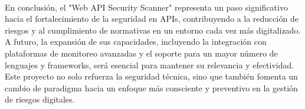 \documentclass{article}
\begin{document}
    \\[2\baselineskip]
    En conclusión, el "Web API Security Scanner" representa un paso significativo hacia el fortalecimiento de la seguridad en APIs, contribuyendo a la reducción de riesgos y al cumplimiento de normativas en un entorno cada vez más digitalizado. A futuro, la expansión de sus capacidades, incluyendo la integración con plataformas de monitoreo avanzadas y el soporte para un mayor número de lenguajes y frameworks, será esencial para mantener su relevancia y efectividad. Este proyecto no solo refuerza la seguridad técnica, sino que también fomenta un cambio de paradigma hacia un enfoque más consciente y preventivo en la gestión de riesgos digitales.
\end{document}

